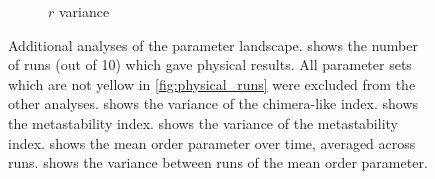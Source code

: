 \begin{figure}[ht!]
\begin{subfigure}{0.3\textwidth}
    \caption{$r$ variance}
    \label{fig:r_var}
  \end{subfigure}%
  \caption[Additional figures]{Additional analyses of the parameter landscape.
     shows the number of runs (out of 10) which gave physical results.
    All parameter sets which are not yellow in \cref{fig:physical_runs} were excluded from the other analyses.
     shows the variance of the chimera-like index.
     shows the metastability index.
     shows the variance of the metastability index.
     shows the mean order parameter over time, averaged across runs.
     shows the variance between runs of the mean order parameter.
  }
  \label{fig:additional_figures}
\end{figure}

